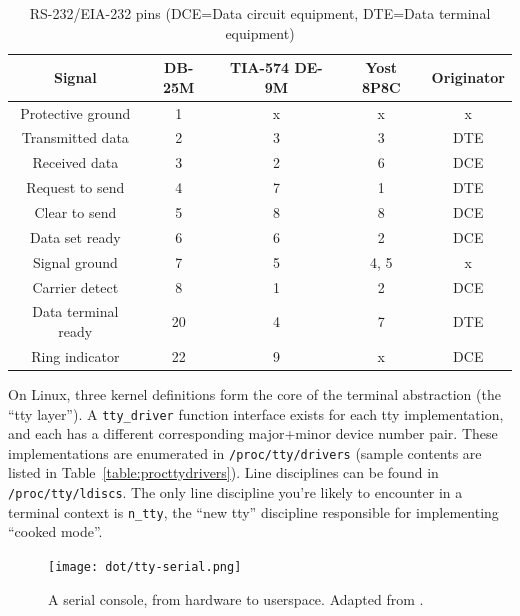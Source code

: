 \begin{table}[!htb]
  \centering
  \begin{tabular}{ |c|c|c|c|c| }
    \hline
    Signal & DB-25M & TIA-574 DE-9M & Yost 8P8C\cite{yost} & Originator \\
    \hline
    \hline
    Protective ground & 1 & x & x & x \\
    \hline
    Transmitted data & 2 & 3 & 3 & DTE \\
    \hline
    Received data & 3 & 2 & 6 & DCE \\
    \hline
    Request to send & 4 & 7 & 1 & DTE \\
    \hline
    Clear to send & 5 & 8 & 8 & DCE \\
    \hline
    Data set ready & 6 & 6 & 2 & DCE \\
    \hline
    Signal ground & 7 & 5 & 4, 5 & x \\
    \hline
    Carrier detect & 8 & 1 & 2 & DCE \\
    \hline
    Data terminal ready & 20 & 4 & 7 & DTE \\
    \hline
    Ring indicator & 22 & 9 & x & DCE \\
    \hline
  \end{tabular}
  \caption[RS-232/EIA-232 pin mappings]{RS-232/EIA-232 pins (DCE=Data circuit equipment, DTE=Data terminal equipment)}
  \label{table:serial}
\end{table}

On Linux, three kernel definitions form the core of the terminal abstraction
(the ``tty layer''). A \texttt{tty\_driver} function interface exists for each
tty implementation, and each has a different corresponding
major+minor device number pair. These implementations are enumerated in
\texttt{/proc/tty/drivers} (sample contents are listed in Table~\ref{table:procttydrivers}).
Line disciplines can be found in \texttt{/proc/tty/ldiscs}. The only line discipline
you're likely to encounter in a terminal context is \texttt{n\_tty}, the ``new tty''
discipline responsible for implementing ``cooked mode''\cite{essentialdrivers}.

\begin{figure}[!htb]
  \centering
  \texttt{[image: dot/tty-serial.png]}
  \caption[A serial console, from hardware to userspace.]
  {A serial console, from hardware to userspace. Adapted from \cite{ttydemystified}.}
  \label{fig:ttysetups}
\end{figure}

